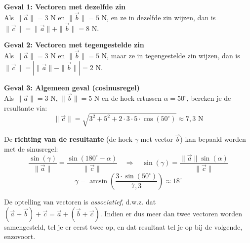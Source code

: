 \documentclass{ximera}
\begin{document}
\begin{example}[title={Voorbeelden van vectoroptellingen}]\nl
    \textbf{Geval 1: Vectoren met dezelfde zin} \\
    Als $\|\vec{a}\| = 3\text{ N}$ en $\|\vec{b}\| = 5\text{ N}$, en ze in dezelfde zin wijzen, dan is $\| \vec{c} \| = \|\vec{a}\| + \|\vec{b}\| = 8\text{ N}$.
    
    \begin{center}
        \captionsetup{width=0.85\textwidth}
    \end{center}

    \textbf{Geval 2: Vectoren met tegengestelde zin} \\
    Als $\|\vec{a}\| = 3\text{ N}$ en $\|\vec{b}\| = 5\text{ N}$, maar ze in tegengestelde zin wijzen, dan is $\| \vec{c} \| = | \|\vec{a}\| - \|\vec{b}\| | = 2\text{ N}$.
    
    \begin{center}
        \captionsetup{width=0.85\textwidth}
    \end{center}

    \textbf{Geval 3: Algemeen geval (cosinusregel)} \\
    Als $\|\vec{a}\| = 3\text{ N}$, $\|\vec{b}\| = 5\text{ N}$ en de hoek ertussen $\alpha = 50^\circ$, bereken je de resultante via:
    \[ \|\vec{c}\| = \sqrt{3^2 + 5^2 + 2 \cdot 3 \cdot 5 \cdot \cos(50^\circ)} \approx 7,3\text{ N} \]

    De \textbf{richting van de resultante} (de hoek $\gamma$ met vector $\vec{b}$) kan bepaald worden met de sinusregel: 
    \[ \frac{\sin(\gamma)}{\|\vec{a}\|} = \frac{\sin(180^\circ-\alpha)}{\|\vec{c}\|} \quad \Longrightarrow \quad \sin(\gamma) = \frac{\|\vec{a}\|\sin(\alpha)}{\|\vec{c}\|} \]
    \[ \gamma = \arcsin\left(\frac{3 \cdot \sin(50^\circ)}{7,3}\right) \approx 18^\circ \]
\end{example}

\begin{remark}
    De optelling van vectoren is \textit{associatief}, d.w.z. dat $(\vec{a} + \vec{b}) + \vec{c} = \vec{a} + (\vec{b} + \vec{c})$. Indien er dus meer dan twee vectoren worden samengesteld, tel je er eerst twee op, en dat resultaat tel je op bij de volgende, enzovoort.
\end{remark}
\end{document}
